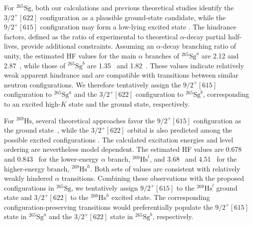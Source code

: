 \documentclass[final,5p,times,twocolumn,number,sort&compress]{elsarticle}
\begin{document}
For $^{265}\mathrm{Sg}$, both our calculations and previous theoretical studies identify the $3/2^+[622]$ configuration as a plausible ground-state candidate, while the $9/2^+[615]$ configuration may form a low-lying excited state \cite{oganessian2024SynthesisDecayProperties,malovElectromagneticTransitionsLowlying2022}. The hindrance factors, defined as the ratio of experimental to theoretical $\alpha$-decay partial half-lives, provide additional constraints. Assuming an $\alpha$-decay branching ratio of unity, the estimated HF values for the main $\alpha$ branches of $^{265}\mathrm{Sg}^{a}$ are 2.12 \cite{oganessianMeasurementsCrossSections2004} and 2.87~\cite{Poenaru1980,Rurarz1983}, while those of $^{265}\mathrm{Sg}^{b}$ are 1.35~\cite{oganessianMeasurementsCrossSections2004} and 1.82~\cite{Poenaru1980,Rurarz1983}. These values indicate relatively weak apparent hindrance and are compatible with transitions between similar neutron configurations. We therefore tentatively assign the $9/2^+[615]$ configuration to $^{265}\mathrm{Sg}^{a}$ and the $3/2^+[622]$ configuration to $^{265}\mathrm{Sg}^{b}$, corresponding to an excited high-$K$ state and the ground state, respectively. 

For $^{269}\mathrm{Hs}$, several theoretical approaches favor the $9/2^+[615]$ configuration as the ground state~\cite{Parkhomenko2005,jachimowicz2025CandidatesThreequasiparticleIsomers,Berger2003Gogny,malovElectromagneticTransitionsLowlying2022,oganessian2024SynthesisDecayProperties}, while the $3/2^+[622]$ orbital is also predicted among the possible excited configurations \cite{Parkhomenko2005,malovElectromagneticTransitionsLowlying2022}. The calculated excitation energies and level ordering are nevertheless model dependent. The estimated HF values are 0.678~\cite{oganessianMeasurementsCrossSections2004} and 0.843~\cite{Poenaru1980,Rurarz1983} for the lower-energy $\alpha$ branch, $^{269}\mathrm{Hs}^{l}$, and 3.68~\cite{oganessianMeasurementsCrossSections2004} and 4.51~\cite{Poenaru1980,Rurarz1983} for the higher-energy branch, $^{269}\mathrm{Hs}^{h}$. Both sets of values are consistent with relatively weakly hindered $\alpha$ transitions. Combining these observations with the proposed configurations in $^{265}\mathrm{Sg}$, we tentatively assign $9/2^+[615]$ to the $^{269}\mathrm{Hs}^{l}$ ground state and $3/2^+[622]$ to the $^{269}\mathrm{Hs}^{h}$ excited state. The corresponding configuration-preserving transitions would preferentially populate the $9/2^+[615]$ state in $^{265}\mathrm{Sg}^{a}$ and the $3/2^+[622]$ state in $^{265}\mathrm{Sg}^{b}$, respectively.
\end{document}
